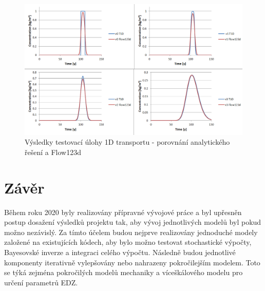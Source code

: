\documentclass[11pt,a4paper]{article}
\begin{document}
\begin{onehalfspacing}
\begin{figure}[h]
\centering
\includegraphics[width=\textwidth]{graphics/v0_3.png}
\caption{Výsledky testovací úlohy 1D transportu - porovnání analytického řešení a Flow123d}
\label{results}
\end{figure}


\section{Závěr}
Během roku 2020 byly realizovány přípravné vývojové práce a byl upřesněn postup dosažení výsledků projektu tak, aby 
vývoj jednotlivých modelů byl pokud možno nezávislý. Za tímto účelem budou nejprve realizovány jednoduché modely založené na existujících kódech, aby bylo možno testovat stochastické výpočty, Bayesovské inverze a integraci celého výpočtu.
Následně budou jednotlivé komponenty iterativně vylepšovány nebo nahrazeny pokročilejším modelem.  Toto se týká zejména 
pokročilých modelů mechaniky a víceškálového modelu pro určení parametrů EDZ.


\end{onehalfspacing}
\end{document}
